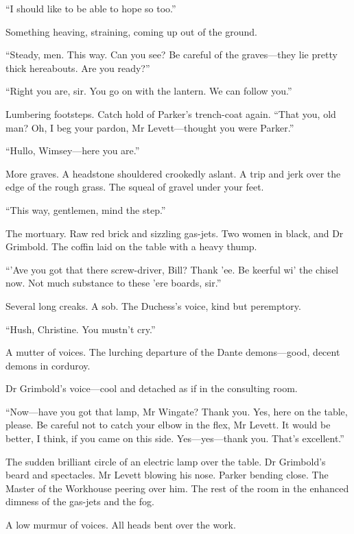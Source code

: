 \enquote{I should like to be able to hope so too.}

Something heaving, straining, coming up out of the ground.

\enquote{Steady, men. This way. Can you see? Be careful of the graves\allowbreak---\allowbreak they lie pretty thick hereabouts. Are you ready?}

\enquote{Right you are, sir. You go on with the lantern. We can follow you.}

Lumbering footsteps. Catch hold of Parker’s trench-coat again. \enquote{That you, old man? Oh, I beg your pardon, Mr Levett\allowbreak---\allowbreak thought you were Parker.}

\enquote{Hullo, Wimsey\allowbreak---\allowbreak here you are.}

More graves. A headstone shouldered crookedly aslant. A trip and jerk over the edge of the rough grass. The squeal of gravel under your feet.

\enquote{This way, gentlemen, mind the step.}

The mortuary. Raw red brick and sizzling gas-jets. Two women in black, and Dr Grimbold. The coffin laid on the table with a heavy thump.

\enquote{’Ave you got that there screw-driver, Bill? Thank ’ee. Be keerful wi’ the chisel now. Not much substance to these ’ere boards, sir.}

Several long creaks. A sob. The Duchess’s voice, kind but peremptory.

\enquote{Hush, Christine. You mustn’t cry.}

A mutter of voices. The lurching departure of the Dante demons\allowbreak---\allowbreak good, decent demons in corduroy.

Dr Grimbold’s voice\allowbreak---\allowbreak cool and detached as if in the consulting room.

\enquote{Now\allowbreak---\allowbreak have you got that lamp, Mr Wingate? Thank you. Yes, here on the table, please. Be careful not to catch your elbow in the flex, Mr Levett. It would be better, I think, if you came on this side. Yes\allowbreak---\allowbreak yes---thank you. That’s excellent.}

The sudden brilliant circle of an electric lamp over the table. Dr Grimbold’s beard and spectacles. Mr Levett blowing his nose. Parker bending close. The Master of the Workhouse peering over him. The rest of the room in the enhanced dimness of the gas-jets and the fog.

A low murmur of voices. All heads bent over the work.

